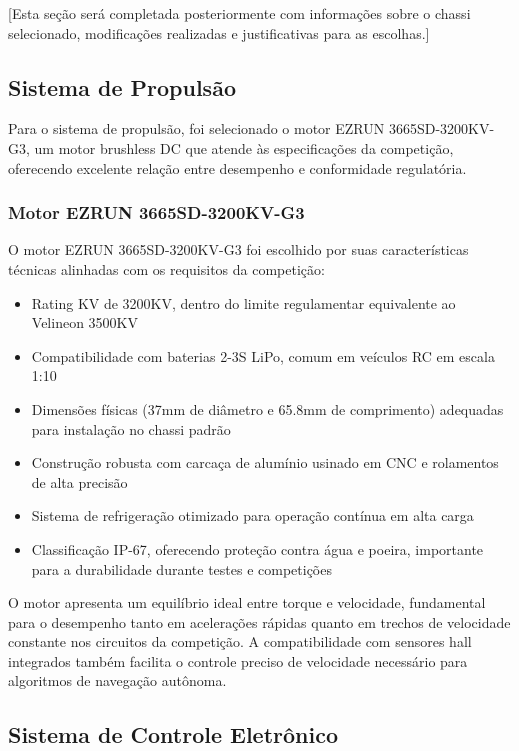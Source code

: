 [Esta seção será completada posteriormente com informações sobre o chassi selecionado, modificações realizadas e justificativas para as escolhas.]

\subsection{Sistema de Propulsão}

Para o sistema de propulsão, foi selecionado o motor EZRUN 3665SD-3200KV-G3, um
motor brushless DC que atende às especificações da competição, oferecendo
excelente relação entre desempenho e conformidade regulatória.

\subsubsection{Motor EZRUN 3665SD-3200KV-G3}

O motor EZRUN 3665SD-3200KV-G3 foi escolhido por suas características técnicas
alinhadas com os requisitos da competição:

\begin{itemize}
    \item Rating KV de 3200KV, dentro do limite regulamentar equivalente ao Velineon
          3500KV
    \item Compatibilidade com baterias 2-3S LiPo, comum em veículos RC em escala 1:10
    \item Dimensões físicas (37mm de diâmetro e 65.8mm de comprimento) adequadas para
          instalação no chassi padrão
    \item Construção robusta com carcaça de alumínio usinado em CNC e rolamentos de alta
          precisão
    \item Sistema de refrigeração otimizado para operação contínua em alta carga
    \item Classificação IP-67, oferecendo proteção contra água e poeira, importante para
          a durabilidade durante testes e competições
\end{itemize}

O motor apresenta um equilíbrio ideal entre torque e velocidade, fundamental
para o desempenho tanto em acelerações rápidas quanto em trechos de velocidade
constante nos circuitos da competição. A compatibilidade com sensores hall
integrados também facilita o controle preciso de velocidade necessário para
algoritmos de navegação autônoma.

\subsection{Sistema de Controle Eletrônico}

